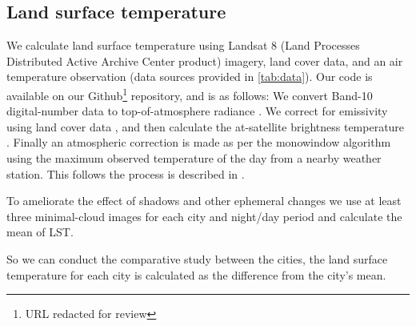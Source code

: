 \documentclass[final,3p,times,twocolumn,sort&compress]{elsarticle}
\begin{document}
\subsection{Land surface temperature}
We calculate land surface temperature using Landsat 8 (Land Processes Distributed Active Archive Center product) imagery, land cover data, and an air temperature observation (data sources provided in \ref{tab:data}). 
Our code is available on our Github\footnote{URL redacted for review} repository, and is as follows:
We convert Band-10 digital-number data to top-of-atmosphere radiance \cite{Jimenez-Munoz2003-wc}. 
We correct for emissivity using land cover data \cite{Alipour2003-gb}, and then calculate the at-satellite brightness temperature \cite{Jimenez-Munoz2003-wc}. 
Finally an atmospheric correction is made as per the monowindow algorithm \cite{Qin2001-jn} using the maximum observed temperature of the day from a nearby weather station. 
This follows the process is described in \cite{Scott2016-lc}. 

To ameliorate the effect of shadows and other ephemeral changes \cite{Zhou2018-iy} we use at least three minimal-cloud images for each city and night/day period and calculate the mean of LST.

So we can conduct the comparative study between the cities, the land surface temperature for each city is calculated as the difference from the city's mean. 
\end{document}
